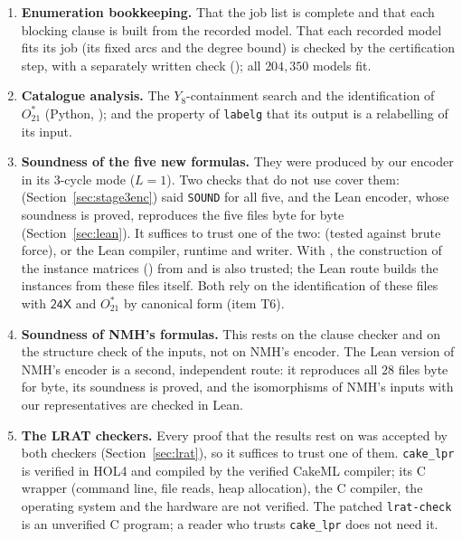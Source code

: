 \documentclass[11pt]{amsart}
\theoremstyle{definition}
\theoremstyle{remark}
\newcommand{\Ostar}{O_{21}^{*}}
\newcommand{\cl}[1]{\textsf{#1}}
\begin{document}
\begin{enumerate}[label=\textbf{T\arabic*.},leftmargin=*]
\item \textbf{Enumeration bookkeeping.} That the job list is complete and that
  each blocking clause is built from the recorded model. That each recorded
  model fits its job (its fixed arcs and the degree bound) is checked by the
  certification step, with a separately written check
  (); all $204{,}350$ models fit.

\item \textbf{Catalogue analysis.} The $Y_8$-containment search and the
  identification of $\Ostar$ (Python, ); and the property
  of \texttt{labelg} that its output is a relabelling of its input.

\item \textbf{Soundness of the five new formulas.} They were produced by our
  encoder in its $3$-cycle mode ($L=1$). Two checks that do not use
   cover them: 
  (Section~\ref{sec:stage3enc}) said \texttt{SOUND} for all five, and the Lean
  encoder, whose soundness is proved, reproduces the five files byte for byte
  (Section~\ref{sec:lean}). It suffices to trust one of the two:
   (tested against brute force), or the Lean compiler,
  runtime and writer. With , the construction of the
  instance matrices () from  and
   is also trusted; the Lean route builds the instances
  from these files itself. Both rely on the identification of these files with
  $\cl{24X}$ and $\Ostar$ by canonical form (item T6).

\item \textbf{Soundness of NMH's formulas.} This rests on the clause checker
   and on the structure check of the inputs, not on NMH's
  encoder. The Lean version of NMH's encoder is a second, independent route:
  it reproduces all $28$ files byte for byte, its soundness is proved, and the
  isomorphisms of NMH's inputs with our representatives are checked in Lean.

\item \textbf{The LRAT checkers.} Every proof that the results rest on was
  accepted by both checkers (Section~\ref{sec:lrat}), so it suffices to trust
  one of them. \texttt{cake\_lpr} is verified in HOL4 and compiled by the
  verified CakeML compiler; its C wrapper (command line, file reads, heap
  allocation), the C compiler, the operating system and the hardware are not
  verified. The patched \texttt{lrat-check} is an unverified C program; a
  reader who trusts \texttt{cake\_lpr} does not need it.


\end{enumerate}
\end{document}
